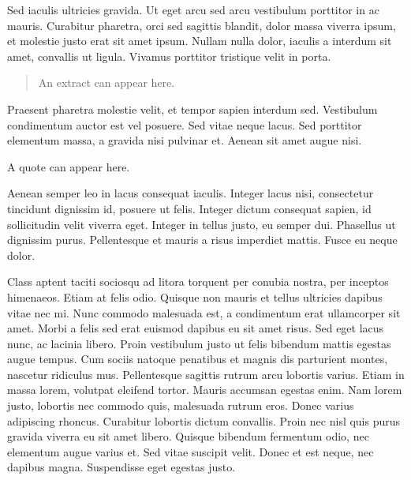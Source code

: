 \begin{shaded}
Sed iaculis ultricies gravida. Ut eget arcu sed arcu vestibulum porttitor in ac mauris. Curabitur pharetra, orci sed sagittis blandit, dolor massa viverra ipsum, et molestie justo erat sit amet ipsum. Nullam nulla dolor, iaculis a interdum sit amet, convallis ut ligula. Vivamus porttitor tristique velit in porta. 
\begin{quote}
An extract can appear here.  
\end{quote}
Praesent pharetra molestie velit, et tempor sapien interdum sed. Vestibulum condimentum auctor est vel posuere. Sed vitae neque lacus. Sed porttitor elementum massa, a gravida nisi pulvinar et. Aenean sit amet augue nisi. 
\begin{italquote}
A quote can appear here.  
\end{italquote}
Aenean semper leo in lacus consequat iaculis. Integer lacus nisi, consectetur tincidunt dignissim id, posuere ut felis. Integer dictum consequat sapien, id sollicitudin velit viverra eget. Integer in tellus justo, eu semper dui. Phasellus ut dignissim purus. Pellentesque et mauris a risus imperdiet mattis. Fusce eu neque dolor.

Class aptent taciti sociosqu ad litora torquent per conubia nostra, per inceptos himenaeos. Etiam at felis odio. Quisque non mauris et tellus ultricies dapibus vitae nec mi. Nunc commodo malesuada est, a condimentum erat ullamcorper sit amet. Morbi a felis sed erat euismod dapibus eu sit amet risus. Sed eget lacus nunc, ac lacinia libero. Proin vestibulum justo ut felis bibendum mattis egestas augue tempus. Cum sociis natoque penatibus et magnis dis parturient montes, nascetur ridiculus mus. Pellentesque sagittis rutrum arcu lobortis varius. Etiam in massa lorem, volutpat eleifend tortor. Mauris accumsan egestas enim. Nam lorem justo, lobortis nec commodo quis, malesuada rutrum eros. Donec varius adipiscing rhoncus. Curabitur lobortis dictum convallis. Proin nec nisl quis purus gravida viverra eu sit amet libero. Quisque bibendum fermentum odio, nec elementum augue varius et. Sed vitae suscipit velit. Donec et est neque, nec dapibus magna. Suspendisse eget egestas justo.


\end{shaded}
